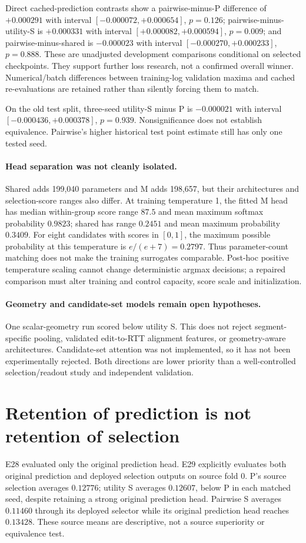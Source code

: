 \documentclass[11pt]{article}
\begin{document}
Direct cached-prediction contrasts show a pairwise-minus-P difference of $+0.000291$
with interval $[-0.000072,+0.000654]$, $p=0.126$; pairwise-minus-utility-S is
$+0.000331$ with interval $[+0.000082,+0.000594]$, $p=0.009$; and pairwise-minus-shared
is $-0.000023$ with interval $[-0.000270,+0.000233]$, $p=0.888$.
These are unadjusted development comparisons conditional on selected checkpoints.
They support further loss research, not a confirmed overall winner. Numerical/batch
differences between training-log validation maxima and cached re-evaluations are retained
rather than silently forcing them to match.

On the old test split, three-seed utility-S minus P is $-0.000021$ with interval
$[-0.000436,+0.000378]$, $p=0.939$. Nonsignificance does not establish equivalence.
Pairwise's higher historical test point estimate still has only one tested seed.

\paragraph{Head separation was not cleanly isolated.}
Shared adds 199,040 parameters and M adds 198,657, but their architectures and selection-score
ranges also differ. At training temperature 1, the fitted M head has median within-group
score range $87.5$ and mean maximum softmax probability $0.9823$; shared has range $0.2451$
and mean maximum probability $0.3409$. For eight candidates with scores in $[0,1]$,
the maximum possible probability at this temperature is $e/(e+7)=0.2797$.
Thus parameter-count matching does not make the training surrogates comparable.
Post-hoc positive temperature scaling cannot change deterministic argmax decisions;
a repaired comparison must alter training and control capacity, score scale and initialization.

\paragraph{Geometry and candidate-set models remain open hypotheses.}
One scalar-geometry run scored below utility S. This does not reject segment-specific pooling,
validated edit-to-RTT alignment features, or geometry-aware architectures. Candidate-set
attention was not implemented, so it has not been experimentally rejected. Both directions
are lower priority than a well-controlled selection/readout study and independent validation.

\section{Retention of prediction is not retention of selection}

E28 evaluated only the original prediction head. E29 explicitly evaluates both original
prediction and deployed selection outputs on source fold 0. P's source selection averages
$0.12776$; utility S averages $0.12607$, below P in each matched seed, despite retaining a
strong original prediction head. Pairwise S averages $0.11460$ through its deployed selector
while its original prediction head reaches $0.13428$.
These source means are descriptive, not a source superiority or equivalence test.
\end{document}
